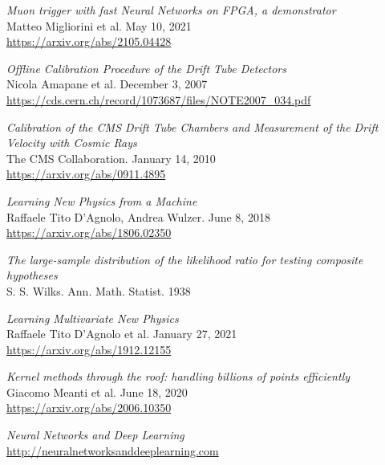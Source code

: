\begin{thebibliography}{99}

    
    \textit{Muon trigger with fast Neural Networks on FPGA, a demonstrator}
    \\Matteo Migliorini et al. May 10, 2021
    \\\url{https://arxiv.org/abs/2105.04428}

    \textit{Offline Calibration Procedure of the Drift Tube Detectors}
    \\Nicola Amapane et al. December 3, 2007
    \\\url{https://cds.cern.ch/record/1073687/files/NOTE2007_034.pdf}

    \textit{Calibration of the CMS Drift Tube Chambers and Measurement of the Drift Velocity with Cosmic Rays}
    \\The CMS Collaboration. January 14, 2010
    \\\url{https://arxiv.org/abs/0911.4895}

    \textit{Learning New Physics from a Machine}
    \\Raffaele Tito D'Agnolo, Andrea Wulzer. June 8, 2018
    \\\url{https://arxiv.org/abs/1806.02350}

    \textit{The large-sample distribution of the likelihood ratio for testing composite hypotheses}
    \\S. S. Wilks. Ann. Math. Statist. 1938

    \textit{Learning Multivariate New Physics}
    \\Raffaele Tito D'Agnolo et al. January 27, 2021
    \\\url{https://arxiv.org/abs/1912.12155}

    \textit{Kernel methods through the roof: handling billions of points efficiently}
    \\Giacomo Meanti et al. June 18, 2020
    \\\url{https://arxiv.org/abs/2006.10350}

    \textit{Neural Networks and Deep Learning}
    \\\url{http://neuralnetworksanddeeplearning.com}

    
\end{thebibliography}

